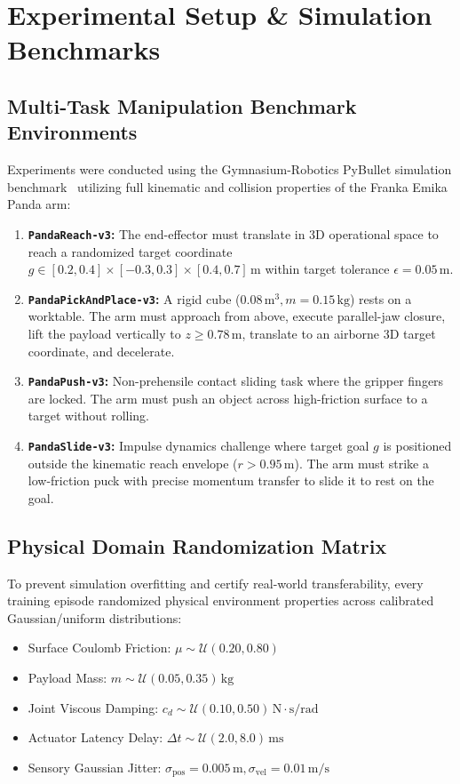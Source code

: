 \documentclass[10pt,twocolumn,a4paper]{article}
\begin{document}
\section{Experimental Setup \& Simulation Benchmarks}
\label{sec:experiments}

\subsection{Multi-Task Manipulation Benchmark Environments}
Experiments were conducted using the Gymnasium-Robotics PyBullet simulation benchmark~\cite{brockman2016openai,coumans2016pybullet} utilizing full kinematic and collision properties of the Franka Emika Panda arm:
\begin{enumerate}
  \item \textbf{\texttt{PandaReach-v3}:} The end-effector must translate in 3D operational space to reach a randomized target coordinate $g \in [0.2, 0.4] \times [-0.3, 0.3] \times [0.4, 0.7]\,\text{m}$ within target tolerance $\epsilon = 0.05\,\text{m}$.
  \item \textbf{\texttt{PandaPickAndPlace-v3}:} A rigid cube ($0.08\,\text{m}^3, m=0.15\,\text{kg}$) rests on a worktable. The arm must approach from above, execute parallel-jaw closure, lift the payload vertically to $z \ge 0.78\,\text{m}$, translate to an airborne 3D target coordinate, and decelerate.
  \item \textbf{\texttt{PandaPush-v3}:} Non-prehensile contact sliding task where the gripper fingers are locked. The arm must push an object across high-friction surface to a target without rolling.
  \item \textbf{\texttt{PandaSlide-v3}:} Impulse dynamics challenge where target goal $g$ is positioned outside the kinematic reach envelope ($r > 0.95\,\text{m}$). The arm must strike a low-friction puck with precise momentum transfer to slide it to rest on the goal.
\end{enumerate}

\subsection{Physical Domain Randomization Matrix}
To prevent simulation overfitting and certify real-world transferability, every training episode randomized physical environment properties across calibrated Gaussian/uniform distributions:
\begin{itemize}
  \item Surface Coulomb Friction: $\mu \sim \mathcal{U}(0.20, 0.80)$
  \item Payload Mass: $m \sim \mathcal{U}(0.05, 0.35)\,\text{kg}$
  \item Joint Viscous Damping: $c_d \sim \mathcal{U}(0.10, 0.50)\,\text{N}\cdot\text{s/rad}$
  \item Actuator Latency Delay: $\Delta t \sim \mathcal{U}(2.0, 8.0)\,\text{ms}$
  \item Sensory Gaussian Jitter: $\sigma_{\text{pos}} = 0.005\,\text{m}, \sigma_{\text{vel}} = 0.01\,\text{m/s}$
\end{itemize}
\end{document}
